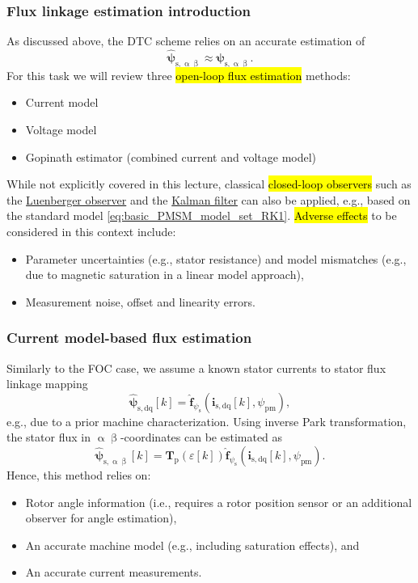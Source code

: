 \begin{frame}
    \frametitle{Flux linkage estimation introduction}
    As discussed above, the DTC scheme relies on an accurate estimation of
    $$
        \hat{\bm{\psi}}_\mathrm{s,\upalpha\upbeta} \approx \bm{\psi}_\mathrm{s,\upalpha\upbeta}.
    $$\pause%
    For this task we will review three \hl{open-loop flux estimation} methods:
    \begin{itemize}
        \item Current model \pause%
        \item Voltage model \pause%
        \item Gopinath estimator (combined current and voltage model)\pause%
    \end{itemize}
    While not explicitly covered in this lecture, classical \hl{closed-loop observers} such as the \href{https://en.wikipedia.org/wiki/State_observer}{Luenberger observer} and the \href{https://en.wikipedia.org/wiki/Kalman_filter}{Kalman filter} can also be applied, e.g., based on the standard model \eqref{eq:basic_PMSM_model_set_RK1}. \pause \hl {Adverse effects} to be considered in this context include:
    \begin{itemize}
        \item Parameter uncertainties (e.g., stator resistance) and model mismatches (e.g., due to magnetic saturation in a linear model approach), \pause%
        \item Measurement noise, offset and linearity errors.
    \end{itemize}
\end{frame}



\begin{frame}
    \frametitle{Current model-based flux estimation}
    Similarly to the FOC case, we assume a known stator currents to stator flux linkage mapping
    $$
        \hat{\bm{\psi}}_\mathrm{s,dq}[k]  = \hat{\bm{f}}_{\psi_\mathrm{s}}(\bm{i}_\mathrm{s,dq}[k], \psi_\mathrm{pm}),
    $$
    e.g., due to a prior machine characterization. \pause Using inverse Park transformation, the stator flux in $\upalpha\upbeta$-coordinates can be estimated as
    $$
        \hat{\bm{\psi}}_\mathrm{s,\upalpha\upbeta}[k]  = \bm{T}_\mathrm{p}(\varepsilon[k]) \hat{\bm{f}}_{\psi_\mathrm{s}}(\bm{i}_\mathrm{s,dq}[k], \psi_\mathrm{pm}).
    $$\pause%
    Hence, this method relies on:
    \begin{itemize}
        \item Rotor angle information (i.e., requires a rotor position sensor or an additional observer for angle estimation), \pause%
        \item An accurate machine model (e.g., including saturation effects), and \pause%
        \item An accurate current measurements.
    \end{itemize}
\end{frame}

